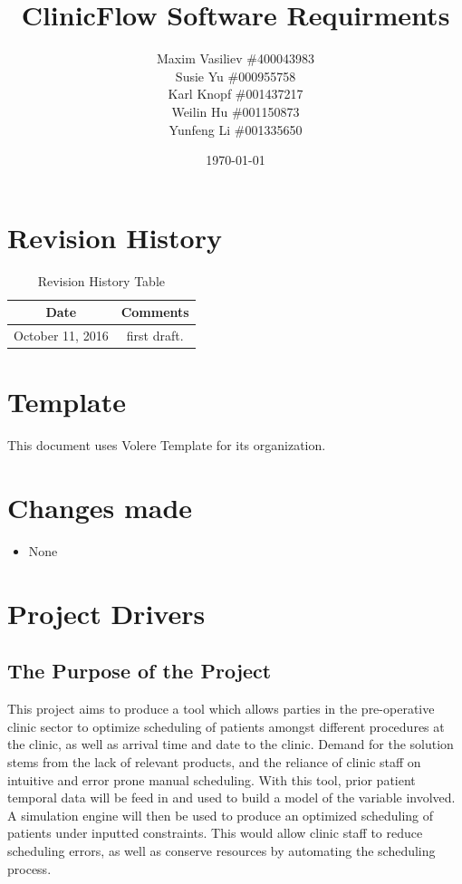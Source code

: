\documentclass[12pt, titlepage]{article}
\begin{document}
\title{ClinicFlow Software Requirments} 
\author{Maxim Vasiliev \#400043983 \\ Susie Yu \#000955758\\ Karl Knopf \#001437217 \\ Weilin Hu \#001150873 \\ Yunfeng Li \#001335650}
\date{\today}
\maketitle

\tableofcontents 

\listoffigures

\listoftables
\pagebreak

\begin{table}[H]
\section*{Revision History}
\begin{tabular}{|c|c|}
\hline
\textbf{Date}  & \textbf{Comments} \\ \hline
October 11, 2016 &  first draft. \\ 
\hline
\end{tabular}
\caption{Revision History Table}
\end{table}

\section*{Template}
This document uses Volere Template for its organization.
\pagebreak

\section{Changes made}
\begin{itemize}
 \item None
\end{itemize}

\section{Project Drivers}

\subsection{The Purpose of the Project}
This project aims to produce a tool which allows parties in the pre-operative clinic sector to optimize scheduling of patients amongst different procedures at the clinic, as well as arrival time and date to the clinic. Demand for the solution stems from the lack of relevant products, and the reliance of clinic staff on intuitive and error prone manual scheduling. With this tool, prior patient temporal data will be feed in and used to build a model of the variable involved. A simulation engine will then be used to produce an optimized scheduling of patients under inputted constraints. This would allow clinic staff to reduce scheduling errors, as well as conserve resources by automating the scheduling process.
\end{document}
